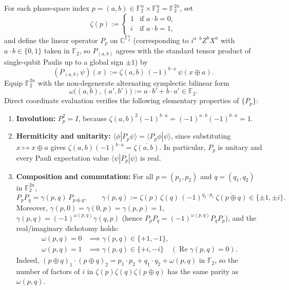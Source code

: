 \documentclass[11pt,a4paper]{article}
\theoremstyle{plain}
\theoremstyle{definition}
\theoremstyle{remark}
\newcommand{\C}{\mathbb{C}}
\newcommand{\F}{\mathbb{F}}
\newcommand{\RePart}{\operatorname{Re}}
\newcommand{\braket}[2]{\langle#1|#2\rangle}
\newcommand{\expval}[2]{\langle#1|#2|#1\rangle}
\numberwithin{equation}{section}
\begin{document}
For each phase-space index $p = (a, b) \in \F_2^n \times \F_2^n = \F_2^{2n}$, set
\[
  \zeta(p) := \begin{cases} 1 & \text{if } a \cdot b = 0, \\ i & \text{if } a \cdot b = 1, \end{cases}
\]
and define the linear operator $P_p$ on $\C^{\F_2^n}$ (corresponding to $i^{a \cdot b} Z^b X^a$ with $a \cdot b \in \{0, 1\}$ taken in $\F_2$, so $P_{(a,b)}$ agrees with the standard tensor product of single-qubit Paulis up to a global sign $\pm 1$) by
\begin{equation}\label{eq:pauli-def}
  (P_{(a,b)}\psi)(x) := \zeta(a, b)\,(-1)^{b \cdot x}\,\psi(x \oplus a).
\end{equation}
Equip $\F_2^{2n}$ with the non-degenerate alternating symplectic bilinear form
\[
  \omega\bigl((a, b), (a', b')\bigr) := a \cdot b' + b \cdot a' \in \F_2.
\]
Direct coordinate evaluation verifies the following elementary properties of $\{P_p\}$:
\begin{enumerate}[label=(\arabic*),leftmargin=2em]
  \item \textbf{Involution:} $P_p^2 = I$, because $\zeta(a,b)^2 (-1)^{b \cdot a} = (-1)^{a \cdot b}(-1)^{b \cdot a} = 1$.
  \item \textbf{Hermiticity and unitarity:} $\braket{\phi}{P_p \psi} = \braket{P_p \phi}{\psi}$, since substituting $x \mapsto x \oplus a$ gives $\zeta(a,b)(-1)^{b \cdot a} = \overline{\zeta(a,b)}$. In particular, $P_p$ is unitary and every Pauli expectation value $\expval{\psi}{P_p}$ is real.
  \item \textbf{Composition and commutation:} For all $p = (p_1, p_2)$ and $q = (q_1, q_2)$ in $\F_2^{2n}$,
  \begin{equation}\label{eq:pauli-comp}
    P_p P_q = \gamma(p, q)\, P_{p \oplus q}, \qquad \gamma(p, q) := \zeta(p)\,\zeta(q)\,(-1)^{q_2 \cdot p_1}\,\overline{\zeta(p \oplus q)} \in \{\pm 1, \pm i\}.
  \end{equation}
  Moreover, $\gamma(p, 0) = \gamma(0, p) = \gamma(p, p) = 1$, $\gamma(p, q) = (-1)^{\omega(p, q)}\gamma(q, p)$ (hence $P_p P_q = (-1)^{\omega(p, q)} P_q P_p$), and the real/imaginary dichotomy holds:
  \begin{equation}\label{eq:gamma-cases}
  \begin{aligned}
    \omega(p, q) = 0 &\implies \gamma(p, q) \in \{+1, -1\}, \\
    \omega(p, q) = 1 &\implies \gamma(p, q) \in \{+i, -i\} \quad (\RePart\gamma(p,q) = 0).
  \end{aligned}
  \end{equation}
  Indeed, $(p \oplus q)_1 \cdot (p \oplus q)_2 = p_1 \cdot p_2 + q_1 \cdot q_2 + \omega(p, q)$ in $\F_2$, so the number of factors of $i$ in $\zeta(p)\zeta(q)\overline{\zeta(p \oplus q)}$ has the same parity as $\omega(p, q)$.
\end{enumerate}
\end{document}
